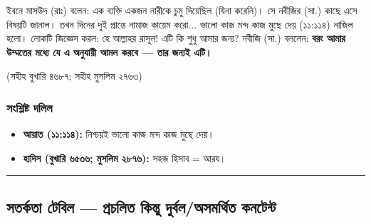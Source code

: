 ইবনে মাসউদ (রাঃ) বলেন: এক ব্যক্তি একজন নারীকে চুমু দিয়েছিল (যিনা করেনি)। সে নবীজির (সা.) কাছে এসে বিষয়টি জানাল। তখন দিনের দুই প্রান্তে নামাজ কায়েম করো... ভালো কাজ মন্দ কাজ মুছে দেয় (১১:১১৪) নাজিল হলো। লোকটি জিজ্ঞেস করল: হে আল্লাহর রাসূল! এটি কি শুধু আমার জন্য? নবীজি (সা.) বললেন: \textbf{বরং আমার উম্মতের মধ্যে যে এ অনুযায়ী আমল করবে — তার জন্যই এটি।}

(সহীহ বুখারি ৪৬৮৭; সহীহ মুসলিম ২৭৬৩)

\subsubsection*{সংশ্লিষ্ট দলিল}

\begin{itemize}
\item \textbf{আয়াত (১১:১১৪):} নিশ্চয়ই ভালো কাজ মন্দ কাজ মুছে দেয়।
\item \textbf{হাদিস (বুখারি ৬৫৩৬; মুসলিম ২৮৭৬):} সহজ হিসাব = আরয।
\end{itemize}
\medskip\hrule\medskip

\subsection*{সতর্কতা টেবিল — প্রচলিত কিন্তু দুর্বল/অসমর্থিত কনটেন্ট}

